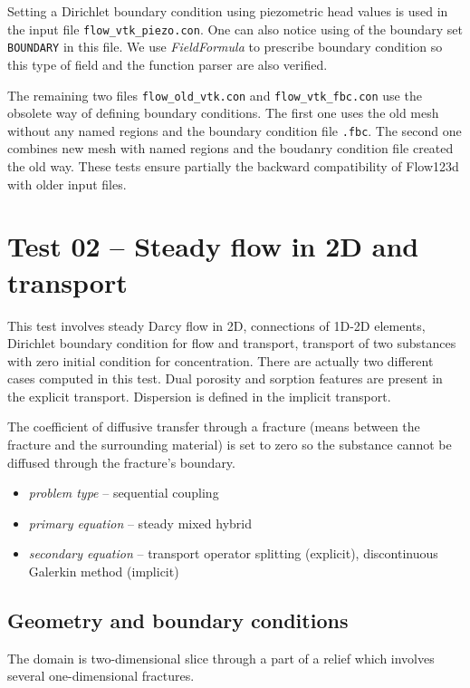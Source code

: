 Setting a Dirichlet boundary condition using piezometric head values is used in the input file \verb'flow_vtk_piezo.con'.
One can also notice using of the boundary set \verb'BOUNDARY' in this file. We use \emph{FieldFormula} to prescribe boundary
condition so this type of field and the function parser are also verified.

The remaining two files \verb'flow_old_vtk.con' and \verb'flow_vtk_fbc.con' use the obsolete way of defining boundary conditions.
The first one uses the old mesh without any named regions and the boundary condition file \verb'.fbc'. The second one combines
new mesh with named regions and the boudanry condition file created the old way. These tests ensure partially the backward 
compatibility of Flow123d with older input files.


\section{Test 02 -- Steady flow in 2D and transport}
\label{sec:test02}
This test involves steady Darcy flow in 2D, connections of 1D-2D elements, Dirichlet boundary condition for flow and transport, 
transport of two substances with zero initial condition for concentration. There are actually two different cases computed in this test. 
Dual porosity and sorption features are present in the explicit transport. Dispersion is defined in the implicit transport.

The coefficient of diffusive transfer through a fracture (means between the fracture and the surrounding material) is set to 
zero so the substance cannot be diffused through the fracture's boundary.

  \begin{itemize} 
    \item \emph{problem type} -- sequential coupling 
    \item \emph{primary equation} -- steady mixed hybrid
    \item \emph{secondary equation} -- transport operator splitting (explicit), discontinuous Galerkin method (implicit)
  \end{itemize}

\subsection*{Geometry and boundary conditions}
The domain is two-dimensional slice through a part of a relief which involves several one-dimensional fractures.

